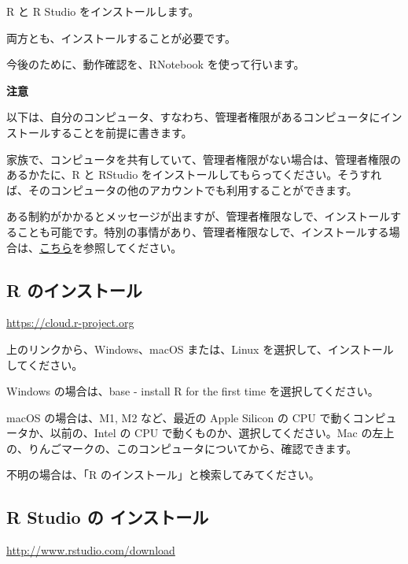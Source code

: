 \documentclass[
  xelatex, ja=standard]{bxjsbook}
\theoremstyle{definition}
\theoremstyle{definition}
\theoremstyle{definition}
\theoremstyle{definition}
\theoremstyle{remark}
\begin{document}
R と R Studio をインストールします。

両方とも、インストールすることが必要です。

今後のために、動作確認を、RNotebook を使って行います。

\textbf{注意}

以下は、自分のコンピュータ、すなわち、管理者権限があるコンピュータにインストールすることを前提に書きます。

家族で、コンピュータを共有していて、管理者権限がない場合は、管理者権限のあるかたに、R と RStudio をインストールしてもらってください。そうすれば、そのコンピュータの他のアカウントでも利用することができます。

ある制約がかかるとメッセージが出ますが、管理者権限なしで、インストールすることも可能です。特別の事情があり、管理者権限なしで、インストールする場合は、\href{https://icu-hsuzuki.github.io/myds/techmemo.html\#\%E9\%9D\%9E\%E7\%AE\%A1\%E7\%90\%86\%E8\%80\%85\%E3\%81\%A8\%E3\%81\%97\%E3\%81\%A6-r-\%E3\%81\%A8-rstudio-\%E3\%82\%92\%E3\%82\%A4\%E3\%83\%B3\%E3\%82\%B9\%E3\%83\%88\%E3\%83\%BC\%E3\%83\%AB}{こちら}を参照してください。

\hypertarget{r-ux306eux30a4ux30f3ux30b9ux30c8ux30fcux30eb}{%
\subsection{R のインストール}\label{r-ux306eux30a4ux30f3ux30b9ux30c8ux30fcux30eb}}

\url{https://cloud.r-project.org}

上のリンクから、Windows、macOS または、Linux を選択して、インストールしてください。

Windows の場合は、base - install R for the first time を選択してください。

macOS の場合は、M1, M2 など、最近の Apple Silicon の CPU で動くコンピュータか、以前の、Intel の CPU で動くものか、選択してください。Mac の左上の、りんごマークの、このコンピュータについてから、確認できます。

不明の場合は、「R のインストール」と検索してみてください。

\hypertarget{r-studio-ux306e-ux30a4ux30f3ux30b9ux30c8ux30fcux30eb}{%
\subsection{R Studio の インストール}\label{r-studio-ux306e-ux30a4ux30f3ux30b9ux30c8ux30fcux30eb}}

\url{http://www.rstudio.com/download}
\end{document}
